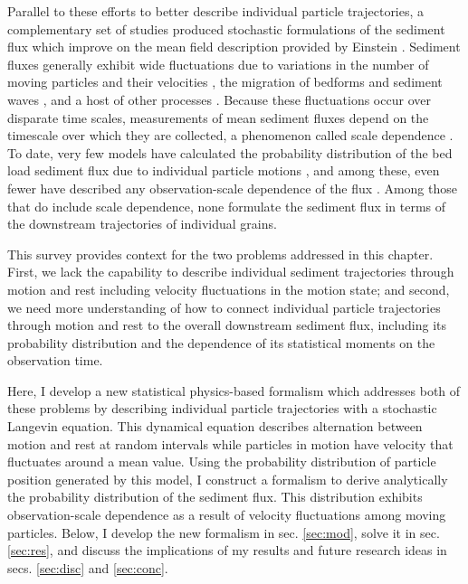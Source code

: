 Parallel to these efforts to better describe individual particle trajectories, a complementary set of studies produced stochastic formulations of the sediment flux which improve on the mean field description provided by Einstein \citep{Turowski2010,Furbish2012a,Ancey2020}. 
Sediment fluxes generally exhibit wide fluctuations due to variations in the number of moving particles and their velocities \citep{Bohm2005a,Ancey2006,Furbish2012a}, the migration of bedforms and sediment waves \citep{Guala2014,Recking2012}, and a host of other processes \citep{Dhont2018}.
Because these fluctuations occur over disparate time scales, measurements of mean sediment fluxes depend on the timescale over which they are collected, a phenomenon called scale dependence \citep{Saletti2015,Dhont2018,Singh2009,Turowski2010,Ancey2020}.
To date, very few models have calculated the probability distribution of the bed load sediment flux due to individual particle motions \citep{Ancey2008,Ancey2014}, and among these, even fewer have described any observation-scale dependence of the flux \citep{Ancey2020a,Turowski2010}.
Among those that do include scale dependence, none formulate the sediment flux in terms of the downstream trajectories of individual grains.

This survey provides context for the two problems addressed in this chapter.
First, we lack the capability to describe individual sediment trajectories through motion and rest including velocity fluctuations in the motion state; and second, we need more understanding of how to connect individual particle trajectories through motion and rest to the overall downstream sediment flux, including its probability distribution and the dependence of its statistical moments on the observation time.

Here, I develop a new statistical physics-based formalism which addresses both of these problems by describing individual particle trajectories with a stochastic Langevin equation.
This dynamical equation describes alternation between motion and rest at random intervals while particles in motion have velocity that fluctuates around a mean value.
Using the probability distribution of particle position generated by this model, I construct a formalism to derive analytically the probability distribution of the sediment flux.
This distribution exhibits observation-scale dependence as a result of velocity fluctuations among moving particles.
Below, I develop the new formalism in sec. \ref{sec:mod}, solve it in sec. \ref{sec:res}, and discuss the implications of my results and future research ideas in secs. \ref{sec:disc} and \ref{sec:conc}.

